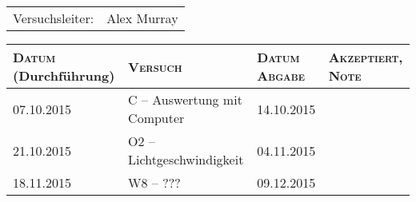\begin{titlepage}

    \maketitle

    \vspace{10mm}
    \begin{center}
    \begin{tabular}{lr}
        \Huge{Versuchsleiter:} & \Huge{Alex Murray} \\
    \end{tabular}

    \vspace{20mm}

    \Large
    \begin{tabular}{p{27mm}|p{67mm}|p{23mm}|p{26mm}}
        \textsc{Datum} \small (Durchf\"uhrung) & \textsc{Versuch} & \textsc{Datum Abgabe} & \textsc{Akzeptiert, Note} \\
        [10mm]
        \hline
        07.10.2015 & C -- Auswertung mit Computer & 14.10.2015 & \\
        [10mm]
        21.10.2015 & O2 -- Lichtgeschwindigkeit   & 04.11.2015 & \\
        [10mm]
        18.11.2015 & W8 -- ???                    & 09.12.2015 & \\

    \end{tabular}
    \end{center}
    \normalsize

\end{titlepage}

